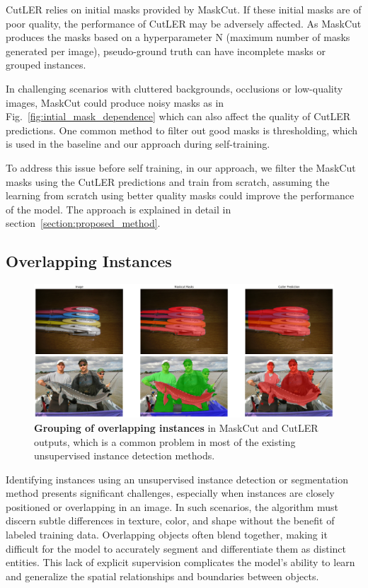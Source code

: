 CutLER relies on initial masks provided by MaskCut. If these initial masks are of poor quality, the performance of CutLER may be adversely affected. As MaskCut produces the masks based on a hyperparameter N (maximum number of masks generated per image), pseudo-ground truth can have incomplete masks or grouped instances.

In challenging scenarios with cluttered backgrounds, occlusions or low-quality images, MaskCut could produce noisy masks as in Fig.~\ref{fig:intial_mask_dependence} which can also affect the quality of CutLER predictions. One common method to filter out good masks is thresholding, which is used in the baseline and our approach during self-training.

To address this issue before self training, in our approach, we filter the MaskCut masks using the CutLER predictions and train from scratch, assuming the learning from scratch using better quality masks could improve the performance of the model. The approach is explained in detail in section~\ref{section:proposed_method}.

\subsection{Overlapping Instances}
\begin{figure}
	\centering
	\includegraphics[width=1\textwidth]{Images/main/cutler-prob-overlap.png}
	\caption[\textbf{Cutler's Performance on Images with Overlapping Instances}]{\textbf{Grouping of overlapping instances} in MaskCut and CutLER outputs, which is a common problem in most of the existing unsupervised instance detection methods.}
	\label{fig:cutler_overlapping_instances_eg}
\end{figure}

Identifying instances using an unsupervised instance detection or segmentation method presents significant challenges, especially when instances are closely positioned or overlapping in an image. In such scenarios, the algorithm must discern subtle differences in texture, color, and shape without the benefit of labeled training data. Overlapping objects often blend together, making it difficult for the model to accurately segment and differentiate them as distinct entities. This lack of explicit supervision complicates the model's ability to learn and generalize the spatial relationships and boundaries between objects.

